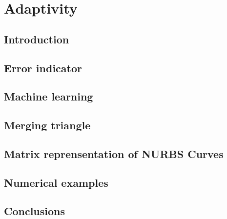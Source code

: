 
\chapter{Adaptivity}

\section{Introduction}

\section{Error indicator}
\label{adap_error_indicator}


\section{Machine learning}



\section{Merging triangle}
\label{adap_merge_triangle}




\section{Matrix reprensentation of NURBS Curves}
\label{adap_sec_mrep2d}



\section{Numerical examples}




\section{Conclusions}

